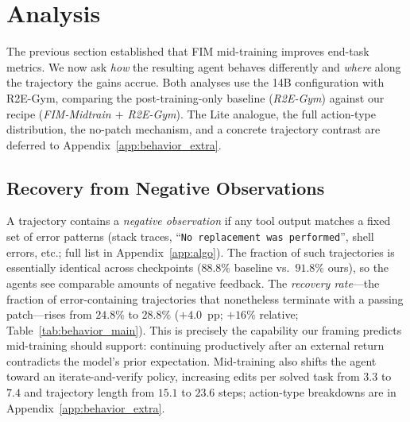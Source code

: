 
\section{Analysis}
\label{sec:analysis}
\vspace{-0.5ex}

The previous section established that FIM mid-training improves end-task
metrics. We now ask \emph{how} the resulting agent behaves differently
and \emph{where} along the trajectory the gains accrue. Both analyses
use the 14B configuration with R2E-Gym, comparing the
post-training-only baseline (\emph{R2E-Gym}) against our recipe
(\emph{FIM-Midtrain $+$ R2E-Gym}). The Lite analogue, the full
action-type distribution, the no-patch mechanism, and a concrete
trajectory contrast are deferred to Appendix~\ref{app:behavior_extra}.

\vspace{-0.5ex}
\subsection{Recovery from Negative Observations}
\label{sec:analysis:recovery}

A trajectory contains a \emph{negative observation} if any tool output
matches a fixed set of error patterns (stack traces,
``\texttt{No replacement was performed}'', shell errors, etc.; full list
in Appendix~\ref{app:algo}). The fraction of such trajectories is
essentially identical across checkpoints ($88.8\%$ baseline vs.\
$91.8\%$ ours), so the agents see comparable amounts of negative
feedback. The \emph{recovery rate}---the fraction of error-containing
trajectories that nonetheless terminate with a passing patch---rises
from $24.8\%$ to $28.8\%$ ($+4.0$~pp; $+16\%$ relative;
Table~\ref{tab:behavior_main}). This is precisely the capability our
framing predicts mid-training should support: continuing productively
after an external return contradicts the model's prior expectation.
Mid-training also shifts the agent toward an iterate-and-verify policy,
increasing edits per solved task from $3.3$ to $7.4$ and trajectory
length from $15.1$ to $23.6$ steps; action-type breakdowns are in
Appendix~\ref{app:behavior_extra}.

